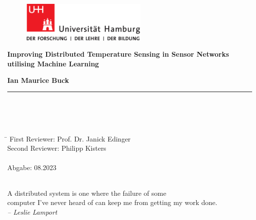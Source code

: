 \begin{titlepage}
	
	\setcounter{page}{-1}
	
	\begin{figure}[h]
		\begin{minipage}[b]{62mm}
			\includegraphics[width=62mm]{images/unilogo}
		\end{minipage}
		\hspace{4cm}
	\end{figure}
	
	\vfill
	
	\begin{center}
		\vspace{14mm}
		\noindent \textbf{\huge
			Improving Distributed Temperature Sensing in Sensor Networks utilising Machine Learning
		}
		\vspace{60mm}	
	\end{center}
	
	\vfill
	
	\noindent \textbf{Ian Maurice Buck} \\
	\noindent \rule{\textwidth}{0.4mm} 
	 \\
	 \\
	 \\
	\begin{tabbing}
		\hspace{8em} \=  \kill
		First Reviewer: \> Prof. Dr. Janick Edinger \\
		Second Reviewer: \> Philipp Kisters \\
		~ \\
		Abgabe: 08.2023
	\end{tabbing}
	
	\newpage 
	\thispagestyle{empty}
	\setcounter{page}{0}
	
	~\\ \vfill \noindent 
	A distributed system is one where the failure of some \\
	computer I've never heard of can keep me from getting my work done. \\
	\textit{-- Leslie Lamport}
\end{titlepage}

